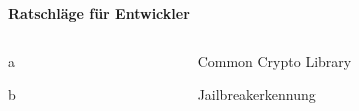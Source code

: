 \begin{frame}
	\centering
	\textbf{Ratschläge für Entwickler}
	
	\begin{columns}[T] %
    	
    	\begin{column}[T]{5cm} %
    		\begin{block}{}
				a
			\end{block}
			\begin{block}{}
				b
			\end{block}
    	\end{column}
    	
    	\begin{column}[T]{5cm} %
    		\begin{block}{}
				Common Crypto Library
			\end{block}
			\begin{block}{}
				Jailbreakerkennung
			\end{block}
    	\end{column}	
    	
    \end{columns}
\end{frame}